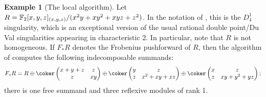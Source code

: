 \documentclass[12pt]{article}
\theoremstyle{theorem}
\numberwithin{thm}{section}
\theoremstyle{definition}
\newtheorem{exa}[thm]{Example}
\newcommand{\mahrud}[1]{{\color{ForestGreen} \sf $\blacklozenge$ Mahrud: [#1]}}
\begin{document}

\begin{exa}[The local algorithm]
  Let $R=\mathbb F_2[x,y,z]_{(x,y,z)}/(x^2y+xy^2+xyz+z^2)$. In the notation of \cite{Artin77}, this is the $D_4^1$ singularity, which is an exceptional version of the usual rational double point/Du Val singularities appearing in characteristic 2.  In particular, note that $R$ is not homogeneous. If $F_* R$ denotes the Frobenius pushforward of $R$, then the algorithm of  computes the following indecomposable summands:
  $$
  F_*R = R\oplus
  \coker
  \begin{pmatrix}
    x+y+z&z\\
    z&xy
  \end{pmatrix}\oplus\coker \begin{pmatrix}
    y&z\\
    z&x^{2}+xy+xz
  \end{pmatrix}\oplus \coker\begin{pmatrix}
  x&z\\
  z&xy+y^{2}+yz
  \end{pmatrix};
  $$
  there is one free summand and three reflexive modules of rank 1.
\end{exa}
\end{document}
